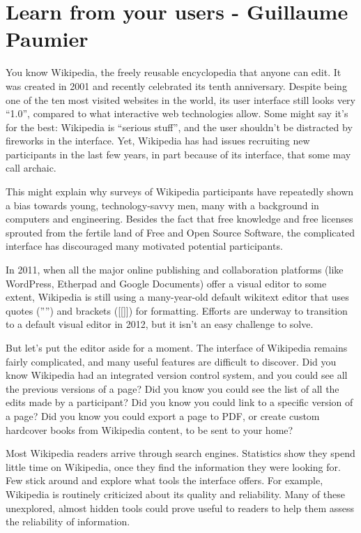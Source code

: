 \section{Learn from your users - Guillaume Paumier}
You know Wikipedia, the freely reusable encyclopedia that anyone can edit. It was created in 2001 and recently celebrated its tenth anniversary. Despite being one of the ten most visited websites in the world, its user interface still looks very ``1.0'', compared to what interactive web technologies allow. Some might say it's for the best: Wikipedia is ``serious stuff'', and the user shouldn't be distracted by fireworks in the interface. Yet, Wikipedia has had issues recruiting new participants in the last few years, in part because of its interface, that some may call archaic.

This might explain why surveys of Wikipedia participants have repeatedly shown a bias towards young, technology-savvy men, many with a background in computers and engineering. Besides the fact that free knowledge and free licenses sprouted from the fertile land of Free and Open Source Software, the complicated interface has discouraged many motivated potential participants.

In 2011, when all the major online publishing and collaboration platforms (like WordPress, Etherpad and Google Documents) offer a visual editor to some extent, Wikipedia is still using a many-year-old default wikitext editor that uses quotes ('''') and brackets ([[]]) for formatting. Efforts are underway to transition to a default visual editor in 2012, but it isn't an easy challenge to solve.

But let's put the editor aside for a moment. The interface of Wikipedia remains fairly complicated, and many useful features are difficult to discover. Did you know Wikipedia had an integrated version control system, and you could see all the previous versions of a page? Did you know you could see the list of all the edits made by a participant? Did you know you could link to a specific version of a page? Did you know you could export a page to PDF, or create custom hardcover books from Wikipedia content, to be sent to your home?

Most Wikipedia readers arrive through search engines. Statistics show they spend little time on Wikipedia, once they find the information they were looking for. Few stick around and explore what tools the interface offers. For example, Wikipedia is routinely criticized about its quality and reliability. Many of these unexplored, almost hidden tools could prove useful to readers to help them assess the reliability of information.


